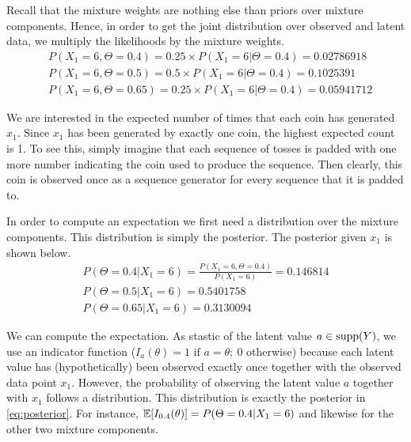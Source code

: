 Recall that the mixture weights are nothing else than priors over mixture components. Hence, in order to get the joint distribution over observed and
latent data, we multiply the likelihoods by the mixture weights.
\begin{align}
&P(X_{1}=6,\Theta=0.4) = 0.25 \times P(X_{1}=6|\Theta=0.4) = 0.02786918 \\
&P(X_{1}=6,\Theta=0.5) = 0.5 \times P(X_{1}=6|\Theta=0.4)  = 0.1025391 \nonumber \\ 
&P(X_{1}=6,\Theta=0.65) =  0.25 \times P(X_{1}=6|\Theta=0.4)  = 0.05941712 \nonumber
\end{align}

We are interested in the expected number of times that each coin has generated $ x_{1} $. Since $ x_{1} $ has been generated by exactly one coin,
the highest expected count is 1. To see this, simply imagine that each sequence of tosses is padded with one more number indicating the coin
used to produce the sequence. Then clearly, this coin is observed once as a sequence generator for every sequence that it is padded to.

In order to compute an expectation we first need a distribution over the mixture components. This distribution is simply the posterior. The
posterior given $ x_{1} $ is shown below.
\begin{align}\label{eq:posterior}
P(\Theta=0.4|X_{1}=6) = \frac{P(X_{1}=6,\Theta=0.4)}{P(X_1 = 6)} = 0.146814 \\
P(\Theta=0.5|X_{1}=6) = 0.5401758 \nonumber \\
P(\Theta=0.65|X_{1}=6) = 0.3130094 \nonumber
\end{align}

We can compute the expectation. As stastic of the latent value $a \in \operatorname{supp}(Y)$, we use an indicator function ($ I_{a}(\theta) = 1 \mbox{ if } a=\theta;~0 $ otherwise) 
because each latent value has (hypothetically) been observed exactly once
together with the observed data point $ x_{1} $. However, the probability of observing the latent value $a$ together with $ x_{1} $ follows a distribution.
This distribution is exactly the posterior in \eqref{eq:posterior}. For instance, $ \mathbb{E}[I_{0.4}(\theta)] = P(\Theta=0.4|X_{1}=6) $ and likewise for the
other two mixture components.

